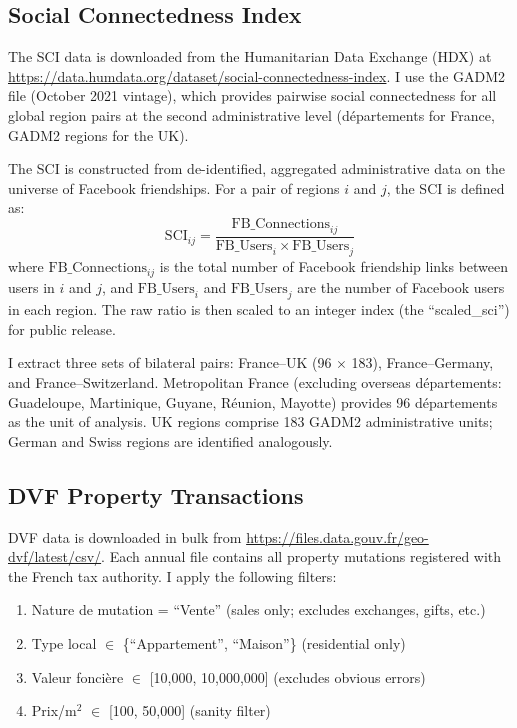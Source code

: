 \documentclass[12pt]{article}
\providecommand{\EUR}[1]{\texteuro{}#1}
\begin{document}
\subsection{Social Connectedness Index}

The SCI data is downloaded from the Humanitarian Data Exchange (HDX) at \url{https://data.humdata.org/dataset/social-connectedness-index}. I use the GADM2 file (October 2021 vintage), which provides pairwise social connectedness for all global region pairs at the second administrative level (d\'epartements for France, GADM2 regions for the UK).

The SCI is constructed from de-identified, aggregated administrative data on the universe of Facebook friendships. For a pair of regions $i$ and $j$, the SCI is defined as:
\begin{equation}
\text{SCI}_{ij} = \frac{\text{FB\_Connections}_{ij}}{\text{FB\_Users}_i \times \text{FB\_Users}_j}
\end{equation}
where $\text{FB\_Connections}_{ij}$ is the total number of Facebook friendship links between users in $i$ and $j$, and $\text{FB\_Users}_i$ and $\text{FB\_Users}_j$ are the number of Facebook users in each region. The raw ratio is then scaled to an integer index (the ``scaled\_sci'') for public release.

I extract three sets of bilateral pairs: France--UK (96 $\times$ 183), France--Germany, and France--Switzerland. Metropolitan France (excluding overseas d\'epartements: Guadeloupe, Martinique, Guyane, R\'eunion, Mayotte) provides 96 d\'epartements as the unit of analysis. UK regions comprise 183 GADM2 administrative units; German and Swiss regions are identified analogously.

\subsection{DVF Property Transactions}

DVF data is downloaded in bulk from \url{https://files.data.gouv.fr/geo-dvf/latest/csv/}. Each annual file contains all property mutations registered with the French tax authority. I apply the following filters:

\begin{enumerate}
\item Nature de mutation = ``Vente'' (sales only; excludes exchanges, gifts, etc.)
\item Type local $\in$ \{``Appartement'', ``Maison''\} (residential only)
\item Valeur fonci\`ere $\in$ [\EUR{10,000}, \EUR{10,000,000}] (excludes obvious errors)
\item Prix/m$^2$ $\in$ [\EUR{100}, \EUR{50,000}] (sanity filter)
\end{enumerate}
\end{document}
